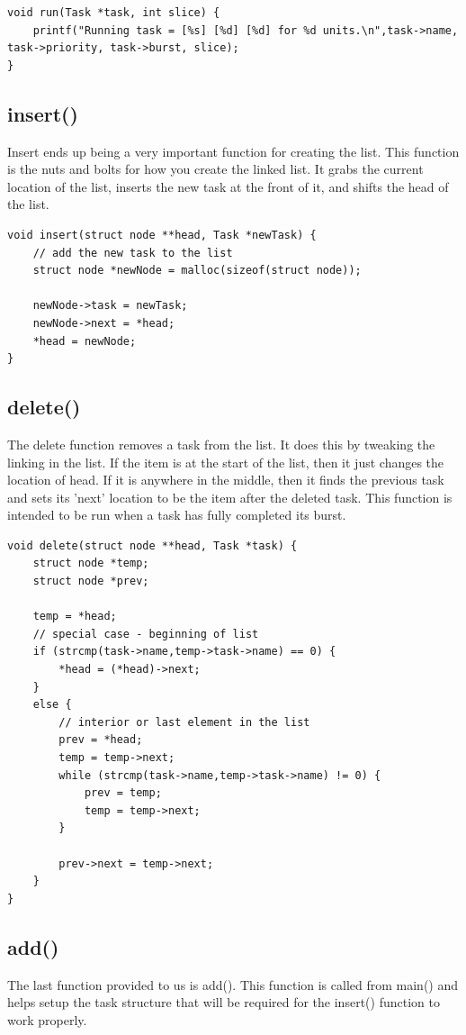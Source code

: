 \documentclass[10pt]{article}
\begin{document}
\begin{verbatim}
void run(Task *task, int slice) {
    printf("Running task = [%s] [%d] [%d] for %d units.\n",task->name, task->priority, task->burst, slice);
}
\end{verbatim}

\subsection{insert()}
Insert ends up being a very important function for creating the list.  This function is the nuts and bolts for how you create the linked list.  It grabs the current location of the list, inserts the new task at the front of it, and shifts the head of the list.

\begin{verbatim}
void insert(struct node **head, Task *newTask) {
    // add the new task to the list 
    struct node *newNode = malloc(sizeof(struct node));

    newNode->task = newTask;
    newNode->next = *head;
    *head = newNode;
}
\end{verbatim}
\subsection{delete()}
The delete function removes a task from the list.  It does this by tweaking the linking in the list.  If the item is at the start of the list, then it just changes the location of head.  If it is anywhere in the middle, then it finds the previous task and sets its 'next' location to be the item after the deleted task.  This function is intended to be run when a task has fully completed its burst. 

\begin{verbatim}
void delete(struct node **head, Task *task) {
    struct node *temp;
    struct node *prev;

    temp = *head;
    // special case - beginning of list
    if (strcmp(task->name,temp->task->name) == 0) {
        *head = (*head)->next;
    }
    else {
        // interior or last element in the list
        prev = *head;
        temp = temp->next;
        while (strcmp(task->name,temp->task->name) != 0) {
            prev = temp;
            temp = temp->next;
        }

        prev->next = temp->next;
    }
}
\end{verbatim}

\subsection{add()}
The last function provided to us is add().  This function is called from main() and helps setup the task structure that will be required for the insert() function to work properly. 
\end{document}

